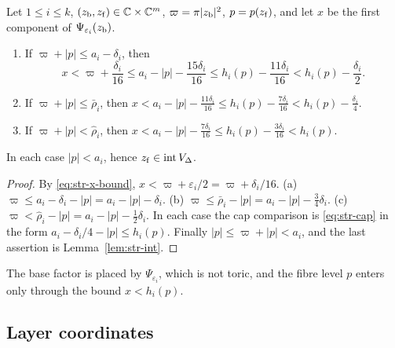 \begin{lemma}\label{lem:str-ball}
Let $1\le i\le k$, $(z_{\rm b},z_{\rm f})\in\mathbb{C}\times\mathbb{C}^m$, $\varpi=\pi|z_{\rm b}|^2$, $p=p(z_{\rm f})$, and let $x$ be the first
component of $\Psi_{\varepsilon_i}(z_{\rm b})$.
\begin{enumerate}[label=(\alph*)]
\item If $\varpi+|p|\le a_i-\delta_i$, then
\begin{equation}\label{eq:str-ball}
 x<\varpi+\frac{\delta_i}{16}\le a_i-|p|-\frac{15\delta_i}{16}
 \le h_i(p)-\frac{11\delta_i}{16}<h_i(p)-\frac{\delta_i}2 .
\end{equation}
\item If $\varpi+|p|\le\bar\rho_i$, then $x<a_i-|p|-\frac{11\delta_i}{16}\le h_i(p)-\frac{7\delta_i}{16}<h_i(p)-\frac{\delta_i}4$.
\item If $\varpi+|p|<\hat\rho_i$, then $x<a_i-|p|-\frac{7\delta_i}{16}\le h_i(p)-\frac{3\delta_i}{16}<h_i(p)$.
\end{enumerate}
In each case $|p|<a_i$, hence $z_{\rm f}\in\operatorname{int}V_\Delta$.
\end{lemma}

\begin{proof}
By \eqref{eq:str-x-bound}, $x<\varpi+\varepsilon_i/2=\varpi+\delta_i/16$. (a) $\varpi\le a_i-\delta_i-|p|=a_i-|p|-\delta_i$. (b)
$\varpi\le\bar\rho_i-|p|=a_i-|p|-\frac34\delta_i$. (c) $\varpi<\hat\rho_i-|p|=a_i-|p|-\frac12\delta_i$. In each case the
cap comparison is \eqref{eq:str-cap} in the form $a_i-\delta_i/4-|p|\le h_i(p)$. Finally $|p|\le\varpi+|p|<a_i$, and the last
assertion is Lemma~\ref{lem:str-int}.
\end{proof}

The base factor is placed by $\Psi_{\varepsilon_i}$, which is not toric, and the fibre level $p$ enters only through the bound
$x<h_i(p)$.

\subsection{Layer coordinates}\label{sec:str-layer-coords}

